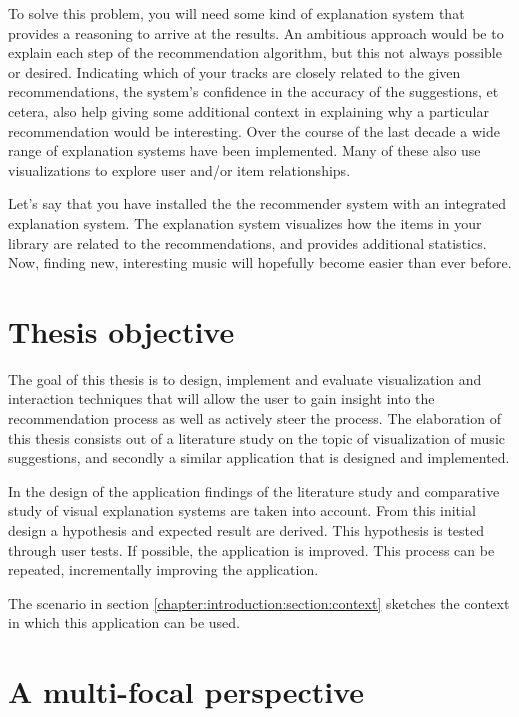 To solve this problem, you will need some kind of explanation system that provides a reasoning to arrive at the results. An ambitious approach would be to explain each step of the recommendation algorithm, but this not always possible or desired. Indicating which of your tracks are closely related to the given recommendations, the system's confidence in the accuracy of the suggestions, et cetera, also help giving some additional context in explaining why a particular recommendation would be interesting\cite{herlocker:2000}. Over the course of the last decade a wide range of explanation systems have been implemented. Many of these also use visualizations to explore user and/or item relationships\cite{bostandjiev:2012, crnovrsanin:2011:VRN:2421953.2422013, faridani:2010:opinionspace, gou:2011:SIF:2016656.2016671, gretarsson:2010, odonovan:2008}.

Let's say that you have installed the the recommender system with an integrated explanation system. The explanation system visualizes how the items in your library are related to the recommendations, and provides additional statistics. Now, finding new, interesting music will hopefully become easier than ever before.

\section{Thesis objective}\label{chapter:introduction:section:objective}

The goal of this thesis is to design, implement and evaluate visualization and interaction techniques that will allow the user to gain insight into the recommendation process as well as actively steer the process. The elaboration of this thesis consists out of a literature study on the topic of visualization of music suggestions, and secondly a similar application that is designed and implemented\cite{kuleuven:2008:t313}.

In the design of the application findings of the literature study and comparative study of visual explanation systems are taken into account. From this initial design a hypothesis and expected result are derived. This hypothesis is tested through user tests. If possible, the application is improved. This process can be repeated, incrementally improving the application.

The scenario in section \ref{chapter:introduction:section:context} sketches the context in which this application can be used.


\section{A multi-focal perspective}\label{chapter:introduction:section:perspective}

